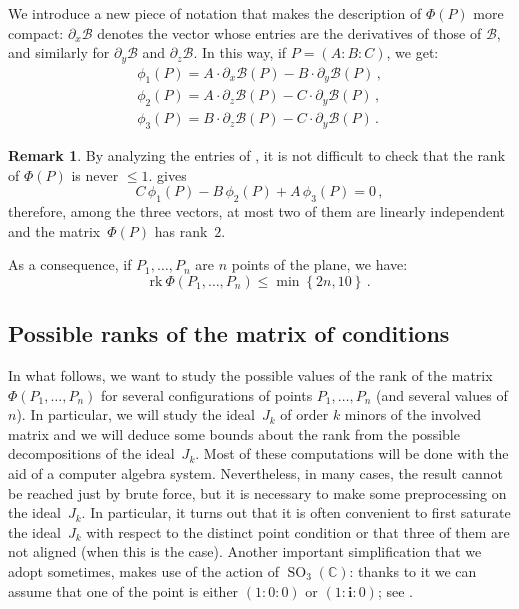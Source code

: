 \documentclass{amsart}
\theoremstyle{plain}
\theoremstyle{definition}
\newtheorem{rmk}[lemma]{Remark}
\newcommand{\C}{\mathbb{C}}
\newcommand{\de}{\partial}
\newcommand{\SO}{\operatorname{SO}}
\newcommand{\iii}{\textbf{i}}
\newcommand{\rk}{\ensuremath{\mathrm{rk}}}
\begin{document}
We introduce a new piece of notation that makes the description of $\Phi(P)$ more compact: $\de_x \mathcal{B}$ denotes the vector whose entries are the derivatives of those of $\mathcal{B}$, and similarly for $\de_y \mathcal{B}$ and $\de_z \mathcal{B}$.
In this way, if $P=(A: B: C)$, we get:
%
\begin{equation}
\label{equation:vector_conditions}
\begin{gathered}
\phi_1(P) = A\cdot \de_x \mathcal{B}(P) - B\cdot \de_y \mathcal{B}(P) \,, \\
\phi_2(P) = A\cdot \de_z \mathcal{B}(P) - C\cdot \de_y \mathcal{B}(P) \,, \\
\phi_3(P) = B\cdot \de_z \mathcal{B}(P) - C\cdot \de_y \mathcal{B}(P) \,.
\end{gathered}
\end{equation}
%
\begin{rmk}
By analyzing the entries of , it is not difficult to check that the rank of $\Phi(P)$ is never $\leq 1$.  gives
\begin{equation}
  C \, \phi_1(P) - B \, \phi_2(P) + A \, \phi_3(P) = 0 \,,
  \label{eq:base}
\end{equation}
therefore,
among the three vectors, at most two of them are linearly independent and the matrix~$\Phi(P)$ has rank~$2$.
\end{rmk}

As a consequence, if $P_1, \dots, P_n$ are $n$ points of the plane, we have:
\begin{equation}
\label{bound_rank}
\rk  \  \Phi(P_1, \dots, P_n) \leq \min \left\{2n, 10 \right\} \,.
\end{equation}

\subsection{Possible ranks of the matrix of conditions}

In what follows, we want to study the possible values of the rank of the matrix
$\Phi(P_1, \dots, P_n)$ for several configurations of points $P_1, \dots, P_n$
(and several values of $n$).
In particular, we will study the ideal~$J_k$ of order $k$ minors of the
involved matrix and we will deduce some bounds about the rank from the possible
decompositions of the ideal~$J_k$. Most of these computations will be done
with the aid of a computer algebra system. Nevertheless, in many cases,
the result cannot be reached just by brute force, but it is necessary to
make some preprocessing on the ideal~$J_k$. In particular, it turns out that
it is often convenient to first saturate the ideal~$J_k$ with respect to
the distinct point condition or that three of them are not aligned (when this is the
case). Another important simplification that we adopt sometimes, makes use
of the action of $\SO_3(\C)$: thanks to it we can assume that one of
the point is either $(1: 0: 0)$ or $(1: \iii: 0)$; see .
\end{document}
